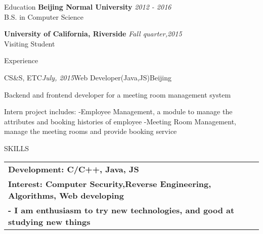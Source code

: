 \documentclass{resume} %
\begin{document}

\begin{rSection}{Education}
{\bf Beijing Normal University } \hfill {\em 2012 - 2016}\\
B.S. in Computer Science 

{\bf University of California, Riverside} \hfill {\em Fall quarter,2015}\\
Visiting Student
\end{rSection}


\begin{rSection}{Experience}

\begin{rSubsection}{CS\&S, ETC}{ {\em July, 2015}}{Web Developer(Java,JS)}{Beijing}
\item Backend and frontend developer for a meeting room management system
\item Intern project includes: 
\subitem -Employee Management, a module to manage the attributes and booking histories of employee 
\subitem -Meeting Room Management, manage the meeting rooms and provide booking service 
\end{rSubsection}


\end{rSection}


\begin{rSection}{SKILLS}

\begin{tabular}{ @{} >{\bfseries}l }
Development: { \rm C/C++, Java, JS} \\
Interest: { \rm Computer Security,Reverse Engineering, Algorithms, Web developing}\\
- { \rm I am enthusiasm to try new technologies,  and good at studying new things}
\end{tabular}

\end{rSection}
\end{document}
